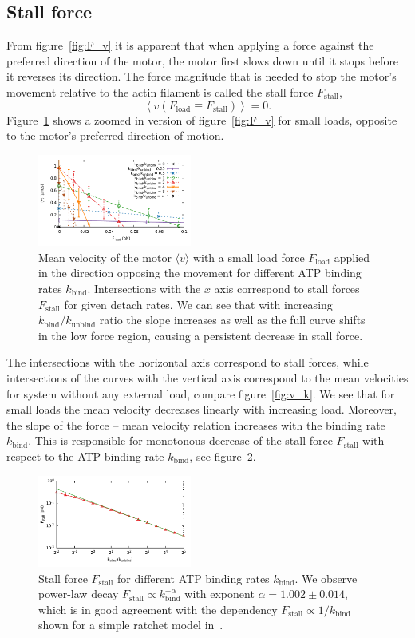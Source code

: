 \documentclass[aps,pre,twocolumn,showpacs,showkeys,superscriptaddress,floatfix]{revtex4-1}
\begin{document}
\subsection{Stall force}
From figure~\ref{fig:F_v} it is apparent that when applying a force against the preferred direction of the motor, 
the motor first slows down until it stops before it reverses its direction. 
The force magnitude that is needed to stop the motor's movement relative to the actin filament is called the stall force $F_\text{stall}$,  
\[
\left\langle v ( F_\text{load} \equiv F_\text{stall} ) \right\rangle = 0 .
\]
Figure~\ref{fig:F_v_zoom} shows a zoomed in version of figure~\ref{fig:F_v} for small loads, opposite to the motor's preferred direction of motion. 
\begin{figure}[t]
\centering
\includegraphics[width=0.45\textwidth,height=!]{F_v_zoom}
\caption{
\label{fig:F_v_zoom} 
Mean velocity of the motor $\langle v \rangle$ with a small load force $F_\text{load}$ applied in the direction opposing the movement for different ATP binding rates $k_\text{bind}$.
Intersections with the $x$ axis correspond to stall forces $F_\text{stall}$ for given detach rates. 
We can see that with increasing $k_\text{bind}/k_\text{unbind}$ ratio the slope increases as well as the full curve shifts in the low force region, causing a persistent decrease in stall force. 
}
\end{figure}
The intersections with the horizontal axis correspond to stall forces,  
while intersections of the curves with the vertical axis correspond to the mean velocities for system without any external load, compare figure~\ref{fig:v_k}. 
We see that for small loads the mean velocity decreases linearly with increasing load. 
Moreover, the slope of the force -- mean velocity relation increases with the binding rate $k_\text{bind}$. 
This is responsible for monotonous decrease of the stall force $F_\text{stall}$ with respect to the ATP binding rate $k_\text{bind}$, see figure~\ref{fig:k_Fstall}.
\begin{figure}[t]
\centering
\includegraphics[width=0.45\textwidth,height=!]{k_Fstall}
\caption{
\label{fig:k_Fstall} 
Stall force $F_\text{stall}$ for different ATP binding rates $k_\text{bind}$.
We observe power-law decay $F_\text{stall} \propto k_\text{bind}^{-\alpha}$ with exponent $\alpha = 1.002 \pm 0.014$,
which is in good agreement with the dependency $F_\text{stall} \propto 1 / k_\text{bind}$ shown for a simple ratchet model in~\cite{astumian1996mechanochemical}. 
}
\end{figure}
\end{document}

